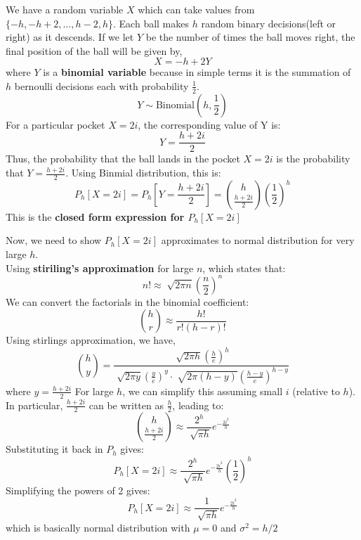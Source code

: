 \begin{solution}
	We have a random variable $X$ which can take values from $\{-h,-h+2,\ldots,h-2,h\}$. Each ball makes $h$ random binary decisions(left or right) as it descends. If we let $Y$ be the number of times the ball moves right, the final position of the ball will be given by,
	\[X = -h+2Y\]
	where $Y$ is a \textbf{binomial variable} because in simple terms it is the summation of $h$ bernoulli decisions each with probability $\frac{1}{2}$.
	\[Y \sim \text{Binomial}(h,\frac{1}{2})\]
	For a particular pocket $X = 2i$, the corresponding value of Y is:
	\[Y = \frac{h+2i}{2}\]
	Thus, the probability that the ball lands in the pocket $X=2i$ is the probability that $Y = \frac{h+2i}{2}$. Using Binmial distribution, this is:
	\[P_h[X=2i]=P_h\left[Y=\frac{h+2i}{2}\right]=\binom{h}{\frac{h+2i}{2}}\left(\frac{1}{2}\right)^h\]
	This is the \textbf{closed form expression for $P_h[X=2i]$}

	Now, we need to show $P_h[X=2i]$ approximates to normal distribution for very large $h$.\\
	Using \textbf{stiriling's approximation} for large $n$, which states that:
	\[n!\approx \sqrt[]{2\pi n}\left(\frac{n}{2}\right)^n\]
	We can convert the factorials in the binomial coefficient:
	\[\binom{h}{r} \approx \frac{h!}{r!(h-r)!}\]
	Using stirlings approximation, we have,
	\[\binom{h}{y} = \frac{\sqrt[]{2\pi h}\left(\frac{h}{e}\right)^h}{\sqrt[]{2\pi y}\left(\frac{y}{e}\right)^y\cdot \sqrt[]{2\pi(h-y)}\left(\frac{h-y}{e}\right)^{h-y}}\]
	where $y = \frac{h+2i}{2}$
	For large $h$, we can simplify this assuming small $i$ (relative to $h$). In particular, $\frac{h+2i}{2}$ can be written as $\frac{h}{2}$, leading to:
	\[\binom{h}{\frac{h+2i}{2}} \approx \frac{2^h}{\sqrt[]{\pi h}}e^{-\frac{2i^2}{h}}\]
	Substituting it back in $P_h$ gives:
	\[P_h[X=2i]\approx \frac{2^h}{\sqrt[]{\pi h}}e^{-\frac{2i^2}{h}}\left(\frac{1}{2}\right)^h \]
	Simplifying the powers of 2 gives:
	\[P_h[X=2i]\approx \frac{1}{\sqrt[]{\pi h}}e^{-\frac{2i^2}{h}} \]
	which is basically normal distribution with $\mu = 0$ and $\sigma^2=h/2$
\end{solution}
